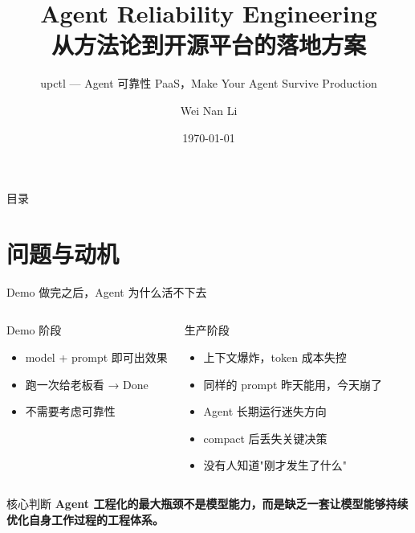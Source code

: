 \documentclass[12pt,aspectratio=169,utf8]{beamer}
\title{\textbf{Agent Reliability Engineering}\\[4pt]{\Large 从方法论到开源平台的落地方案}}
\subtitle{upctl --- Agent 可靠性 PaaS，Make Your Agent Survive Production}
\author{Wei Nan Li}
\date{\today}
\institute{\textbf{鉬馨玥翼}~\textregistered\\[2pt]{\small RI XINYUE YI}}
\begin{document}
\begin{frame}[plain]
  \titlepage
\end{frame}

\begin{frame}[shrink=10]{目录}
  \tableofcontents
\end{frame}

\section{问题与动机}

\begin{frame}[shrink=3]{Demo 做完之后，Agent 为什么活不下去}
  \begin{columns}[T]
    \begin{block}{Demo 阶段}
      \begin{itemize}
        \item model + prompt 即可出效果
        \item 跑一次给老板看 → Done
        \item 不需要考虑可靠性
      \end{itemize}
    \end{block}

    \begin{block}{生产阶段}
      \begin{itemize}
        \item 上下文爆炸，token 成本失控
        \item 同样的 prompt 昨天能用，今天崩了
        \item Agent 长期运行迷失方向
        \item compact 后丢失关键决策
        \item 没有人知道"刚才发生了什么"
      \end{itemize}
    \end{block}
  \end{columns}

  \vspace{2pt}
  \begin{alertblock}{核心判断}
    \footnotesize\textbf{Agent 工程化的最大瓶颈不是模型能力，而是缺乏一套让模型能够持续优化自身工作过程的工程体系。}
  \end{alertblock}
\end{frame}
\end{document}
